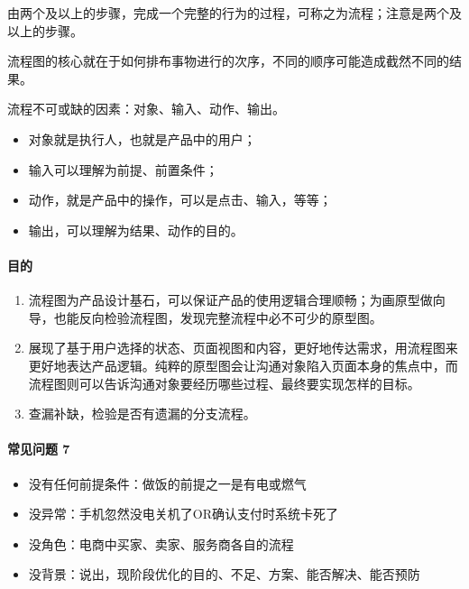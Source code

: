 \documentclass[letterpaper,11pt,english]{sphinxmanual}
\begin{document}
由两个及以上的步骤，完成一个完整的行为的过程，可称之为流程；注意是两个及以上的步骤。

流程图的核心就在于如何排布事物进行的次序，不同的顺序可能造成截然不同的结果。

流程不可或缺的因素：对象、输入、动作、输出。
\begin{itemize}
\item {} 
对象就是执行人，也就是产品中的用户；

\item {} 
输入可以理解为前提、前置条件；

\item {} 
动作，就是产品中的操作，可以是点击、输入，等等；

\item {} 
输出，可以理解为结果、动作的目的。

\end{itemize}


\paragraph{目的}
\label{\detokenize{chapter_knowledge/flow_chart:id5}}\begin{enumerate}
%
\item {} 
流程图为产品设计基石，可以保证产品的使用逻辑合理顺畅；为画原型做向导，也能反向检验流程图，发现完整流程中必不可少的原型图。

\item {} 
展现了基于用户选择的状态、页面视图和内容，更好地传达需求，用流程图来更好地表达产品逻辑。纯粹的原型图会让沟通对象陷入页面本身的焦点中，而流程图则可以告诉沟通对象要经历哪些过程、最终要实现怎样的目标。

\item {} 
查漏补缺，检验是否有遗漏的分支流程。

\end{enumerate}


\paragraph{常见问题 7\sphinxfootnotemark[507]}
\label{\detokenize{chapter_knowledge/flow_chart:id6}}%
\begin{footnotetext}[507]\sphinxAtStartFootnote
{}
%
\end{footnotetext}\ignorespaces \begin{itemize}
\item {} 
没有任何前提条件：做饭的前提之一是有电或燃气

\item {} 
没异常：手机忽然没电关机了OR确认支付时系统卡死了

\item {} 
没角色：电商中买家、卖家、服务商各自的流程

\item {} 
没背景：说出，现阶段优化的目的、不足、方案、能否解决、能否预防

\end{itemize}
\end{document}
